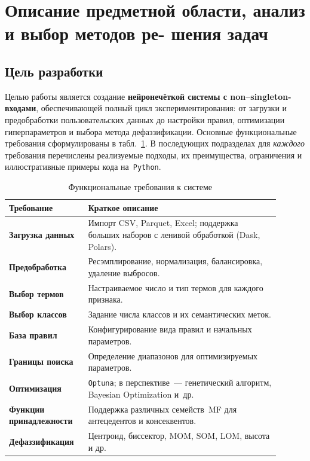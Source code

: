 \section{Описание предметной области, анализ и выбор методов ре-
шения задач}
\label{sec:software_design}

\subsection{Цель разработки}
\label{subsec:goal}

Целью работы является создание \textbf{нейронечёткой системы с non--singleton-входами}, обеспечивающей полный цикл экспериментирования: от загрузки и предобработки пользовательских данных до настройки правил, оптимизации гиперпараметров и выбора метода дефаззификации.  
Основные функциональные требования сформулированы в табл.~\ref{tab:req}. В последующих подразделах для \emph{каждого} требования перечислены реализуемые подходы, их преимущества, ограничения и иллюстративные примеры кода на~\texttt{Python}.

\begin{table}[h]
\centering\small
\caption{Функциональные требования к системе}
\label{tab:req}
\begin{tabular}{p{0.25\linewidth}p{0.65\linewidth}}
\toprule
Требование & Краткое описание \\
\midrule
\textbf{Загрузка данных} & Импорт CSV, Parquet, Excel; поддержка больших наборов с ленивой обработкой (Dask, Polars).\\
\textbf{Предобработка} & Ресэмплирование, нормализация, балансировка, удаление выбросов.\\
\textbf{Выбор термов} & Настраиваемое число и тип термов для каждого признака.\\
\textbf{Выбор классов} & Задание числа классов и их семантических меток.\\
\textbf{База правил} & Конфигурирование вида правил и начальных параметров.\\
\textbf{Границы поиска} & Определение диапазонов для оптимизируемых параметров.\\
\textbf{Оптимизация} & \texttt{Optuna}; в перспективе~--- генетический алгоритм, Bayesian Optimization и~др.\\
\textbf{Функции принадлежности} & Поддержка различных семейств~MF для антецедентов и консеквентов.\\
\textbf{Дефаззификация} & Центроид, биссектор, MOM, SOM, LOM, высота и др. \\
\bottomrule
\end{tabular}
\end{table}


